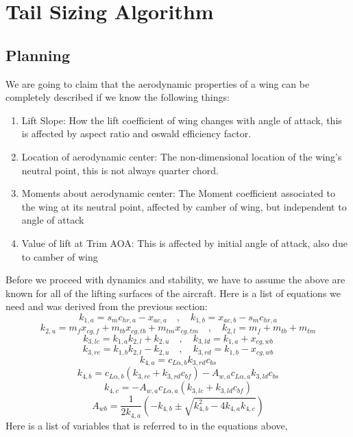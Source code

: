 
\section{Tail Sizing Algorithm}
\begin{comment}
\end{comment}

\subsection{Planning}
\begin{comment}
\end{comment}
We are going to claim that the aerodynamic properties of a wing can be completely described if we know the following things:
\begin{enumerate}
\item Lift Slope: How the lift coefficient of wing changes with angle of attack, this is affected by aspect ratio and oswald efficiency factor.
\item Location of aerodynamic center: The non-dimensional location of the wing's neutral point, this is not always quarter chord.
\item Moments about aerodynamic center: The Moment coefficient associated to the wing at its neutral point, affected by camber of wing, but independent to angle of attack
\item Value of lift at Trim AOA: This is affected by initial angle of attack, also due to camber of wing
\end{enumerate}
Before we proceed with dynamics and stability, we have to assume the above are known for all of the lifting surfaces of the aircraft.
Here is a list of equations we need and was derived from the previous section:
$$k_{1,a} = s_{m}c_{hr,a} - x_{ac,a} \quad,\quad k_{1,b} = x_{ac,b} -s_{m}c_{hr,a}$$ 
$$k_{2,u} = m_{f}x_{cg,f} + m_{tb}x_{cg,tb} + m_{tm}x_{cg,tm} \quad,\quad k_{2,l} = m_{f} + m_{tb} + m_{tm}$$ 
$$k_{3,lc} = k_{1,a}k_{2,l} + k_{2,u} \quad,\quad k_{3,ld} = k_{1,a} + x_{cg,wb}$$ 
$$k_{3,rc} = k_{1,b}k_{2,l} - k_{2,u} \quad,\quad k_{3,rd} = k_{1,b} - x_{cg,wb}$$ 
$$k_{4,a} = c_{L\alpha,b}k_{3,rd}c_{bs}$$ 
$$k_{4,b} = c_{L\alpha,b}(k_{3,rc}+k_{3,rd}c_{bf})-A_{w,a}c_{L\alpha,a}k_{3,ld}c_{bs}$$ 
$$k_{4,c} =  - A_{w,a}c_{L\alpha,a}(k_{3,lc}+k_{3,ld}c_{bf})$$ 
$$A_{wb} = \frac{1}{2k_{4,a}}\left(-k_{4,b} \pm \sqrt{k_{4,b}^{2}-4k_{4,a}k_{4,c}}\right)$$
Here is a list of variables that is referred to in the equations above,
